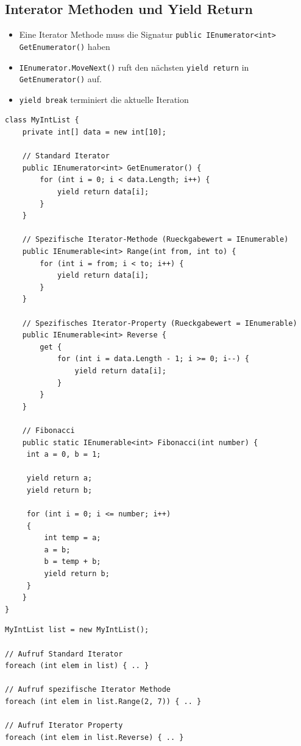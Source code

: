\subsection{Interator Methoden und Yield Return}
\begin{itemize}
	\item Eine Iterator Methode muss die Signatur \lstinline[]|public IEnumerator<int> GetEnumerator()| haben
	\item \lstinline|IEnumerator.MoveNext()| ruft den nächsten \lstinline|yield return| in \lstinline|GetEnumerator()| auf.
	\item \lstinline|yield break| terminiert die aktuelle Iteration
\end{itemize}
\begin{lstlisting}
class MyIntList {
	private int[] data = new int[10];
	
	// Standard Iterator
	public IEnumerator<int> GetEnumerator() {
		for (int i = 0; i < data.Length; i++) {
			yield return data[i];
		}
	}
	
	// Spezifische Iterator-Methode (Rueckgabewert = IEnumerable)
	public IEnumerable<int> Range(int from, int to) {
		for (int i = from; i < to; i++) {
			yield return data[i];
		}
	}
	
	// Spezifisches Iterator-Property (Rueckgabewert = IEnumerable)
	public IEnumerable<int> Reverse {
		get {
			for (int i = data.Length - 1; i >= 0; i--) {
				yield return data[i];
			}
		}
	}
	
	// Fibonacci
	public static IEnumerable<int> Fibonacci(int number) {
	 int a = 0, b = 1;
	 
	 yield return a;
	 yield return b;
	 
	 for (int i = 0; i <= number; i++)
	 {
		 int temp = a;
		 a = b;
		 b = temp + b;
		 yield return b;
	 }	 
	}
}
\end{lstlisting}

\begin{lstlisting}
MyIntList list = new MyIntList();

// Aufruf Standard Iterator
foreach (int elem in list) { .. }

// Aufruf spezifische Iterator Methode
foreach (int elem in list.Range(2, 7)) { .. }

// Aufruf Iterator Property
foreach (int elem in list.Reverse) { .. }
\end{lstlisting}

\clearpage

